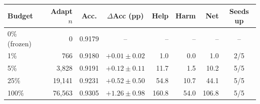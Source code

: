 \begin{tabular}{@{}lrccrrrc@{}}
\toprule
Budget & Adapt $n$ & Acc. & $\Delta$Acc (pp) & Help & Harm & Net & Seeds up \\
\midrule
0\% (frozen) & 0 & 0.9179 & -- & -- & -- & -- & -- \\
1\% & 766 & 0.9180 & $+0.01\pm0.02$ & 1.0 & 0.0 & 1.0 & 2/5 \\
5\% & 3{,}828 & 0.9191 & $+0.12\pm0.11$ & 11.7 & 1.5 & 10.2 & 5/5 \\
25\% & 19{,}141 & 0.9231 & $+0.52\pm0.50$ & 54.8 & 10.7 & 44.1 & 5/5 \\
100\% & 76{,}563 & 0.9305 & $+1.26\pm0.98$ & 160.8 & 54.0 & 106.8 & 5/5 \\
\bottomrule
\end{tabular}
